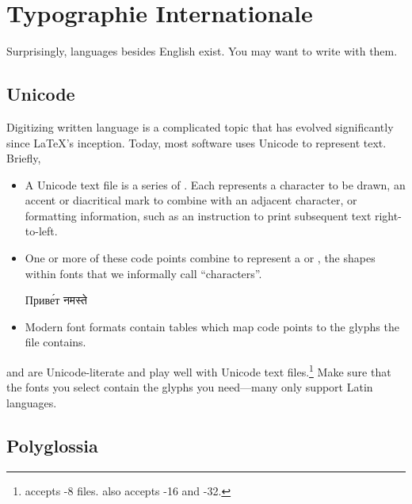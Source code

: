 \chapter{Typographie Internationale}
\label{i18n}

Surprisingly, languages besides English exist.
You may want to write with them.

\section{Unicode}

Digitizing written language is a complicated topic that has evolved significantly
since \LaTeX's inception.
Today, most software uses Unicode to represent text. Briefly,
\begin{itemize}
\item A Unicode text file is a series of .
    Each represents a character to be drawn,
    an accent or diacritical mark to combine with an adjacent
    character,
    or formatting information,
    such as an instruction to print subsequent text right-to-left.
\item One or more of these code points combine to represent a
     or ,
    the shapes within fonts that we informally call ``characters''\quotekern.
\begin{centerfigure}
\large%
%
Приве́т
\quad{}%
नमस्ते
\end{centerfigure}
\item Modern font formats contain tables
    which map code points to the glyphs the file contains.
\end{itemize}
\LuaLaTeX{} and \XeLaTeX{} are Unicode-literate and play well with
Unicode text
files.\punckern\footnote{\LuaLaTeX{} accepts \mbox{-8} files.
\XeLaTeX{} also accepts \mbox{-16} and \mbox{-32}.}
Make sure that the fonts you select contain the glyphs you need---many
only support Latin languages.

\section{Polyglossia}

